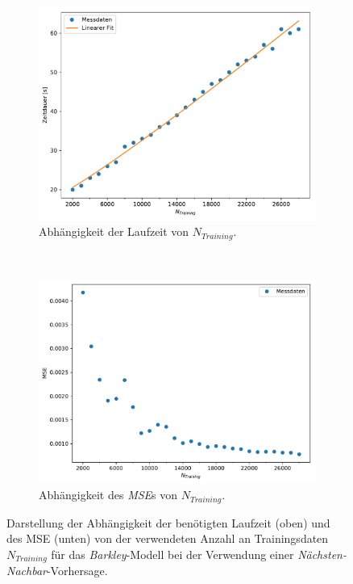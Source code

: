 \begin{figure}[H]
	\centering
	\begin{subfigure}{.95\textwidth}
		\centering
		\hspace*{0.3cm}
		\includegraphics[width=.76\textwidth]{figures/results/cross_prediction/nn_trainlength_uv_time.pdf}
		\caption{Abhängigkeit der Laufzeit von $N_{Training}$.}
	\end{subfigure}%
	\\
	\begin{subfigure}{.95\textwidth}
		\centering
		\includegraphics[width=.80\textwidth]{figures/results/cross_prediction/nn_trainlength_uv_mse.pdf}
		\caption{Abhängigkeit des \textit{MSE}s von $N_{Training}$.}
	\end{subfigure}%
	\caption{Darstellung der Abhängigkeit der benötigten Laufzeit (oben) und des MSE (unten) von der verwendeten Anzahl an Trainingsdaten $N_{Training}$ für das \textit{Barkley}-Modell bei der Verwendung einer \textit{Nächsten-Nachbar}-Vorhersage.}
	\label{fig:exp_cross_nn_trainlength_mse_time_barkley}
\end{figure}


